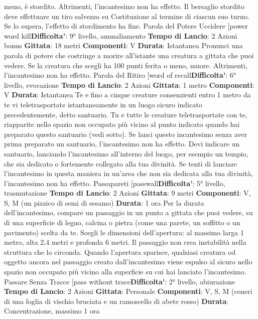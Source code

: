 \begin{multicols}{2}
meno, è stordito. Altrimenti, l’incantesimo non ha
effetto.
Il bersaglio stordito deve effettuare un tiro salvezza su
Costituzione al termine di ciascun suo turno. Se lo
supera, l’effetto di stordimento ha fine.
Parola del Potere Uccidere
[power word kill\textbf{Difficolta'}:
9° livello, ammaliamento
\textbf{Tempo di Lancio}: 2 Azioni bonus
\textbf{Gittata}: 18 metri
\textbf{Componenti}: V
\textbf{Durata}: Istantanea
Pronunci una parola di potere che costringe a morire
all’istante una creatura a gittata che puoi vedere. Se la
creatura che scegli ha 100 punti ferita o meno, muore.
Altrimenti, l’incantesimo non ha effetto.
Parola del Ritiro
[word of recall\textbf{Difficolta'}:
6° livello, evocazione
\textbf{Tempo di Lancio}: 2 Azioni
\textbf{Gittata}: 1 metro
\textbf{Componenti}: V
\textbf{Durata}: Istantanea
Te e fino a cinque creature consenzienti entro 1 metro
da te vi teletrasportate istantaneamente in un luogo
sicuro indicato precedentemente, detto santuario. Tu e
tutte le creature teletrasportate con te, riapparite nello
spazio non occupato più vicino al punto indicato quando
hai preparato questo santuario (vedi sotto). Se lanci
questo incantesimo senza aver prima preparato un
santuario, l’incantesimo non ha effetto.
Devi indicare un santuario, lanciando l’incantesimo
all’interno del luogo, per esempio un tempio, che sia
dedicato o fortemente collegato alla tua divinità. Se tenti
di lanciare l’incantesimo in questa maniera in un’area
che non sia dedicata alla tua divinità, l’incantesimo non
ha effetto.
Passapareti
[passwall\textbf{Difficolta'}:
5° livello, trasmutazione
\textbf{Tempo di Lancio}: 2 Azioni
\textbf{Gittata}: 9 metri
\textbf{Componenti}: V, S, M (un pizzico di semi di sesamo)
\textbf{Durata}: 1 ora
Per la durata dell’incantesimo, compare un passaggio
in un punto a gittata che puoi vedere, su di una
superficie di legno, calcina o pietra (come una parete,
un soffitto o un pavimento) scelta da te. Scegli le
dimensioni dell’apertura: al massimo larga 1 metro, 
alta 2,4 metri e profonda 6 metri. Il passaggio non crea
instabilità nella struttura che lo circonda.
Quando l’apertura sparisce, qualsiasi creatura od
oggetto ancora nel passaggio creato dall’incantesimo
viene espulso al sicuro nello spazio non occupato più
vicino alla superficie su cui hai lanciato l’incantesimo.
Passare Senza Tracce
[pass without trace\textbf{Difficolta'}:
2° livello, abiurazione
\textbf{Tempo di Lancio}: 2 Azioni
\textbf{Gittata}: Personale
\textbf{Componenti}: V, S, M (ceneri di una foglia di vischio
bruciata e un ramoscello di abete rosso)
\textbf{Durata}: Concentrazione, massimo 1 ora

\end{multicols}
